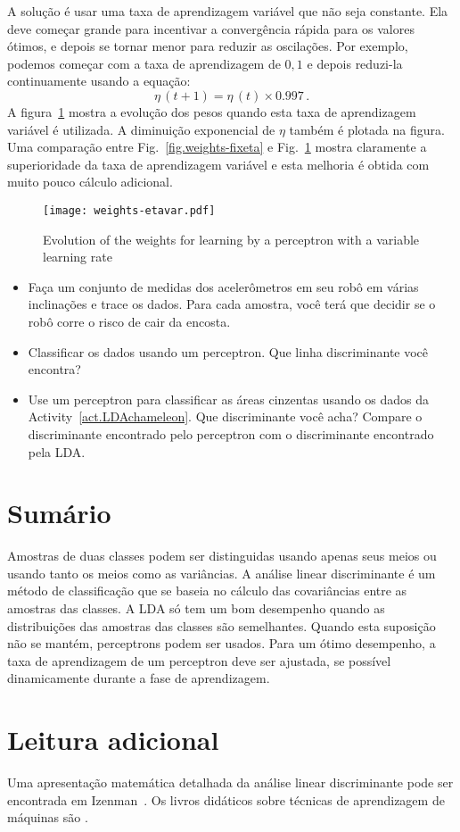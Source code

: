 A solução é usar uma taxa de aprendizagem variável que não seja constante. Ela deve começar grande para incentivar a convergência rápida para os valores ótimos, e depois se tornar menor para reduzir as oscilações. Por exemplo, podemos começar com a taxa de aprendizagem de $0,1$ e depois reduzi-la continuamente usando a equação:
\[
\eta\,(t+1) = \eta\,(t) \times 0.997\,.
\]
A figura~\ref{fig.perceptron-dis-etavar} mostra a evolução dos pesos quando esta taxa de aprendizagem variável é utilizada. A diminuição exponencial de $\eta$ também é plotada na figura. Uma comparação entre Fig.~\ref{fig.weights-fixeta} e Fig.~\ref{fig.perceptron-dis-etavar} mostra claramente a superioridade da taxa de aprendizagem variável e esta melhoria é obtida com muito pouco cálculo adicional.
\begin{figure}
\begin{center}
\texttt{[image: weights-etavar.pdf]}
\end{center}
\caption{Evolution of the weights for learning by a perceptron with a variable learning rate}\label{fig.perceptron-dis-etavar}
\end{figure}

\begin{framed}
\begin{itemize}
\item Faça um conjunto de medidas dos acelerômetros em seu robô em várias inclinações e trace os dados. Para cada amostra, você terá que decidir se o robô corre o risco de cair da encosta.
\item Classificar os dados usando um perceptron. Que linha discriminante você encontra?
\item Use um perceptron para classificar as áreas cinzentas usando os dados da Activity~\ref{act.LDAchameleon}. Que discriminante você acha? Compare o discriminante encontrado pelo perceptron com o discriminante encontrado pela LDA.
\end{itemize}
\end{framed}

\section{Sumário}

Amostras de duas classes podem ser distinguidas usando apenas seus meios ou usando tanto os meios como as variâncias. A análise linear discriminante é um método de classificação que se baseia no cálculo das covariâncias entre as amostras das classes. A LDA só tem um bom desempenho quando as distribuições das amostras das classes são semelhantes. Quando esta suposição não se mantém, perceptrons podem ser usados. Para um ótimo desempenho, a taxa de aprendizagem de um perceptron deve ser ajustada, se possível dinamicamente durante a fase de aprendizagem.

\section{Leitura adicional}

Uma apresentação matemática detalhada da análise linear discriminante pode ser encontrada em Izenman~\cite[Chapter~8]{izenman2008}. Os livros didáticos sobre técnicas de aprendizagem de máquinas são \cite{harrington2012machine, kubat2015machinelearning}.
